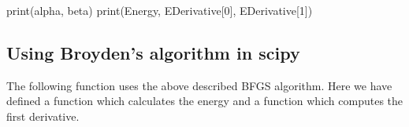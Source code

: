 \documentclass[%
oneside,                 %
final,                   %
10pt]{article}
\begin{document}
print(alpha, beta)
print(Energy, EDerivative[0], EDerivative[1])




\epycod


\subsection{Using Broyden's algorithm in scipy}
The following function uses the above described BFGS algorithm. Here we have defined a function which calculates the energy and a function which computes the first derivative.
\end{document}
